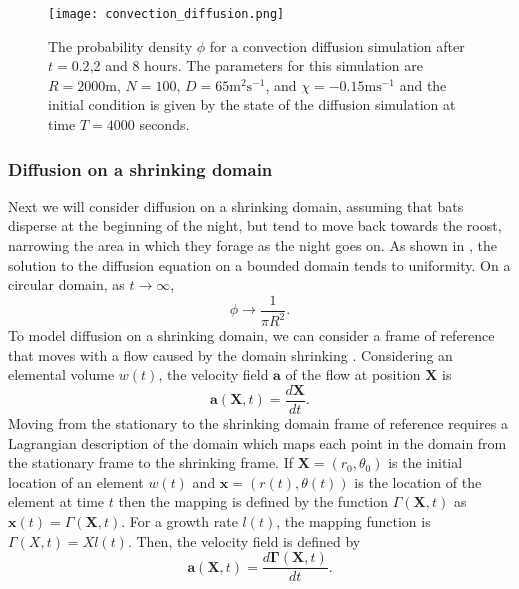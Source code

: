   \begin{figure} [t]
      \centering
          \texttt{[image: convection\_diffusion.png]}
          \caption{The probability density $\phi$ for a convection diffusion simulation after $t = 0.2$,2 and 8 hours. The parameters for this simulation are $R = 2000$m, $N = 100$,
          $D = 65\mathrm{m^2s^{-1}}$, and $\chi = - 0.15\mathrm{ms^{-1}}$ and the initial condition is given by the state of the diffusion simulation at time $T = 4000$ seconds.}
      \label{fig:convection_diffusion}
  \end{figure}


\subsubsection{Diffusion on a shrinking domain} \label{shrink}
 Next we will consider diffusion on a shrinking domain, assuming that bats disperse at the beginning of the night, but tend to move back towards the roost, narrowing the area in which they forage as the night goes on. As shown in , the solution to the diffusion equation on a bounded domain tends to uniformity. On a circular domain, as $t\rightarrow \infty$,
  \begin{equation}
  \phi \rightarrow \frac{1}{\pi R^2}.
  \label{eqn:uniform_circle}
  \end{equation}
 To model diffusion on a shrinking domain, we can consider a frame of reference that moves with a flow caused by the domain shrinking \cite{crampinnonuniform}. Considering an elemental volume $w(t)$, the velocity field $\bm{a}$ of the flow at position $\bm{X}$ is
%
\begin{equation}
\bm{a}(\bm{X},t) = \frac{d\bm{X}}{dt}.
\end{equation}
%
Moving from the stationary to the shrinking domain frame of reference requires a Lagrangian description of the domain which maps each point in the domain from the stationary frame to the shrinking frame. If $\bm{X} = (r_0,\theta_0)$ is the initial location of an element $w(t)$ and $\bm{x} = (r(t),\theta(t))$ is the location of the element at time $t$ then the mapping is defined by the function $\Gamma(\bm{X},t) $ as $\bm{x}(t) =\Gamma(\bm{X},t) $. For a growth rate $l(t)$, the mapping function is $\Gamma(X,t) = Xl(t)$. Then, the velocity field is defined by
%
\begin{equation}
\bm{a}(\bm{X},t) = \frac{d\bm{\Gamma}(\bm{X},t)}{dt} .
\label{dgammadt}
\end{equation}
